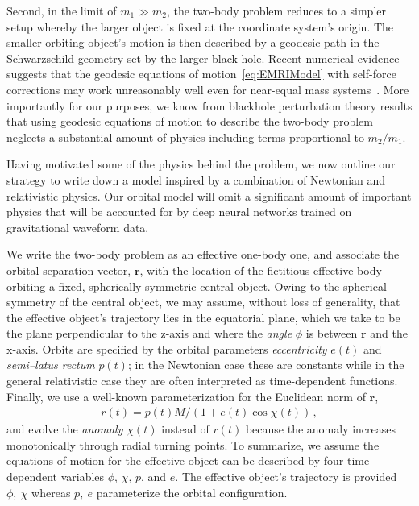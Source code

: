 \documentclass[ reprint,
nofootinbib,
 amsmath,amssymb,
 aps,
]{revtex4-2}
\begin{document}
Second, in the limit of $m_1 \gg m_2$, the two-body problem reduces to a
simpler setup whereby the larger
object is fixed at the coordinate system's origin. The smaller orbiting object's motion is then 
described by a geodesic path in the Schwarzschild geometry set by the 
larger black hole. Recent numerical evidence suggests
that the geodesic equations of motion~\eqref{eq:EMRIModel} 
with self-force corrections may work unreasonably well
even for near-equal mass systems~\cite{lewis2017fundamental,zimmerman2016redshift,le2011periastron,le2012gravitational,le2014overlap,le2013periastron,rifat2020surrogate,pound2019secondorder,van2020intermediate}. 
More importantly for our purposes, we know from 
blackhole perturbation theory results that using geodesic equations of motion 
to describe the two-body problem neglects a
substantial amount of physics including terms proportional to $m_2 / m_1$.

Having motivated some of the physics behind the problem, we now outline 
our strategy to write down a model
inspired by a combination of Newtonian and relativistic physics.
Our orbital model will omit a significant amount of important physics 
that will be accounted for by deep neural networks trained on 
gravitational waveform data.

We write the two-body problem
as an effective one-body one, and associate the orbital separation vector, $\mathbf{r}$,
with the location of the fictitious effective body orbiting a fixed, spherically-symmetric central object.
Owing to the spherical symmetry of the central object,
we may assume, without loss of generality, that the effective object's trajectory
lies in the equatorial plane, which we take to be 
the plane perpendicular to the z-axis and where the 
\emph{angle} $\phi$ is between $\mathbf{r}$ and the x-axis.
Orbits are specified by 
the orbital parameters 
{\em eccentricity} $e(t)$ and {\em semi--latus rectum} $p(t)$; in the Newtonian
case these are constants while in the general relativistic case they are 
often interpreted as time-dependent 
functions. Finally, we use a well-known parameterization for the Euclidean norm of $\mathbf{r}$,
\begin{align} \label{eq:r_parameterization}
r(t) = p(t) M / (1+e(t) \cos\chi(t)) \,,
\end{align}
and evolve the \emph{anomaly} $\chi(t)$
instead of $r(t)$ because the anomaly increases 
monotonically through radial turning points. To summarize, we assume the equations of motion
for the effective object can be described by four time-dependent variables
$\phi$, $\chi$, $p$, and $e$. The effective object's trajectory 
is provided $\phi,~\chi$ whereas $p,~e$ parameterize
the orbital configuration. 
\end{document}
